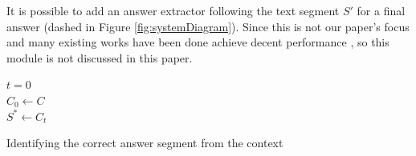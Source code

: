 It is possible to add an answer extractor following the text segment $S'$ for a final answer (dashed in Figure \ref{fig:systemDiagram}). Since this is not our paper's focus and many existing works have been done achieve decent performance \cite{DBLP:conf/ijcai/HuPHQW018}, so this module is not discussed in this paper. %





\begin{algorithm}
\fontsize{9}{10}\selectfont

  $t = 0$\\
  $C_0 \leftarrow C$\\
  $S^* \leftarrow C_t$\\
  \caption{Identifying the correct answer segment from the context}
	  \vspace{-1ex}
  \label{alg:train_beam}
\end{algorithm}

